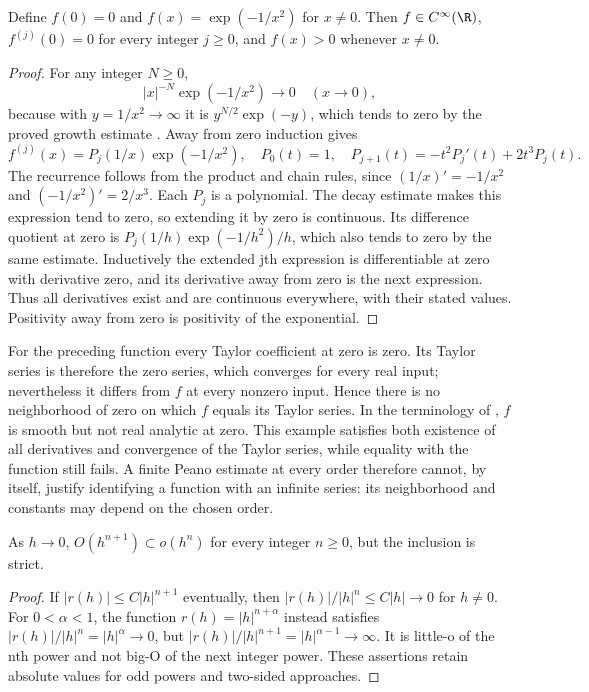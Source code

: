 \begin{construction}
Define $f(0)=0$ and $f(x)=\exp(-1/x^2)$ for $x\ne0$. Then $f\in C^\infty(\R)$, $f^{(j)}(0)=0$ for every integer $j\ge0$, and $f(x)>0$ whenever $x\ne0$.
\end{construction}
\begin{proof}
For any integer $N\ge0$,
\[ |x|^{-N}\exp(-1/x^2)\longrightarrow0\quad(x\to0), \]
because with $y=1/x^2\to\infty$ it is $y^{N/2}\exp(-y)$, which tends to zero by the proved growth estimate . Away from zero induction gives
\[ f^{(j)}(x)=P_j(1/x)\exp(-1/x^2),\quad P_0(t)=1,\quad P_{j+1}(t)=-t^2P_j'(t)+2t^3P_j(t). \]
The recurrence follows from the product and chain rules, since $(1/x)'=-1/x^2$ and $(-1/x^2)'=2/x^3$. Each $P_j$ is a polynomial. The decay estimate makes this expression tend to zero, so extending it by zero is continuous. Its difference quotient at zero is $P_j(1/h)\exp(-1/h^2)/h$, which also tends to zero by the same estimate. Inductively the extended jth expression is differentiable at zero with derivative zero, and its derivative away from zero is the next expression. Thus all derivatives exist and are continuous everywhere, with their stated values. Positivity away from zero is positivity of the exponential.
\end{proof}

\begin{example}
For the preceding function every Taylor coefficient at zero is zero. Its Taylor series is therefore the zero series, which converges for every real input; nevertheless it differs from $f$ at every nonzero input. Hence there is no neighborhood of zero on which $f$ equals its Taylor series. In the terminology of , $f$ is smooth but not real analytic at zero. This example satisfies both existence of all derivatives and convergence of the Taylor series, while equality with the function still fails. A finite Peano estimate at every order therefore cannot, by itself, justify identifying a function with an infinite series: its neighborhood and constants may depend on the chosen order.
\end{example}

\begin{proposition}
As $h\to0$, $O(h^{n+1})\subset o(h^n)$ for every integer $n\ge0$, but the inclusion is strict.
\end{proposition}
\begin{proof}
If $|r(h)|\le C|h|^{n+1}$ eventually, then $|r(h)|/|h|^n\le C|h|\to0$ for $h\ne0$. For $0<\alpha<1$, the function $r(h)=|h|^{n+\alpha}$ instead satisfies $|r(h)|/|h|^n=|h|^\alpha\to0$, but $|r(h)|/|h|^{n+1}=|h|^{\alpha-1}\to\infty$. It is little-o of the nth power and not big-O of the next integer power. These assertions retain absolute values for odd powers and two-sided approaches.
\end{proof}

